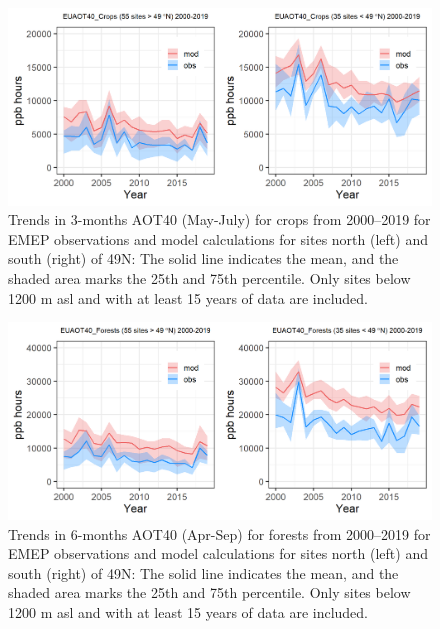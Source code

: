 \begin{figure}[h]
	\centering
	\includegraphics[width=0.74\paperwidth]{FIGS_TRENDS/EUAOT40_Crops_2000_2019_1200m.png}
	\caption{\label{fig:O3_aot40croptrends} Trends in 3-months AOT40 (May-July) for crops from 2000--2019 for EMEP observations and model calculations for sites north (left) and south (right) of 49\degrees N: The solid line indicates the mean, and the shaded area marks the 25th and 75th percentile. Only sites below 1200 m asl and with at least 15 years of data are included.}
\end{figure}

\begin{figure}[h]
	\centering
	\includegraphics[width=0.74\paperwidth]{FIGS_TRENDS/EUAOT40_Forests_2000_2019_1200m.png}
	\caption{\label{fig:O3_aot40foresttrends}Trends in 6-months AOT40 (Apr-Sep) for forests from 2000--2019 for EMEP observations and model calculations for sites north (left) and south (right) of 49\degrees N: The solid line indicates the mean, and the shaded area marks the 25th and 75th percentile. Only sites below 1200 m asl and with at least 15 years of data are included.}
\end{figure}

